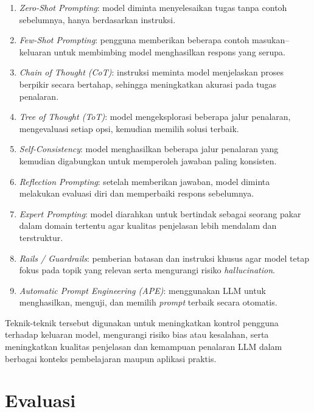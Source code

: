 \begin{enumerate}
    \item \textit{Zero-Shot Prompting}: model diminta menyelesaikan tugas tanpa contoh sebelumnya, hanya berdasarkan instruksi.

    \item \textit{Few-Shot Prompting}: pengguna memberikan beberapa contoh masukan–keluaran untuk membimbing model menghasilkan respons yang serupa.

    \item \textit{Chain of Thought (CoT)}: instruksi meminta model menjelaskan proses berpikir secara bertahap, sehingga meningkatkan akurasi pada tugas penalaran.

    \item \textit{Tree of Thought (ToT)}: model mengeksplorasi beberapa jalur penalaran, mengevaluasi setiap opsi, kemudian memilih solusi terbaik.

    \item \textit{Self-Consistency}: model menghasilkan beberapa jalur penalaran yang kemudian digabungkan untuk memperoleh jawaban paling konsisten.

    \item \textit{Reflection Prompting}: setelah memberikan jawaban, model diminta melakukan evaluasi diri dan memperbaiki respons sebelumnya.

    \item \textit{Expert Prompting}: model diarahkan untuk bertindak sebagai seorang pakar dalam domain tertentu agar kualitas penjelasan lebih mendalam dan terstruktur.

    \item \textit{Rails / Guardrails}: pemberian batasan dan instruksi khusus agar model tetap fokus pada topik yang relevan serta mengurangi risiko \textit{hallucination}.

    \item \textit{Automatic Prompt Engineering (APE)}: menggunakan LLM untuk menghasilkan, menguji, dan memilih \textit{prompt} terbaik secara otomatis.
\end{enumerate}

Teknik-teknik tersebut digunakan untuk meningkatkan kontrol pengguna terhadap keluaran model, mengurangi risiko bias atau kesalahan, serta meningkatkan kualitas penjelasan dan kemampuan penalaran LLM dalam berbagai konteks pembelajaran maupun aplikasi praktis.



\section{Evaluasi}

